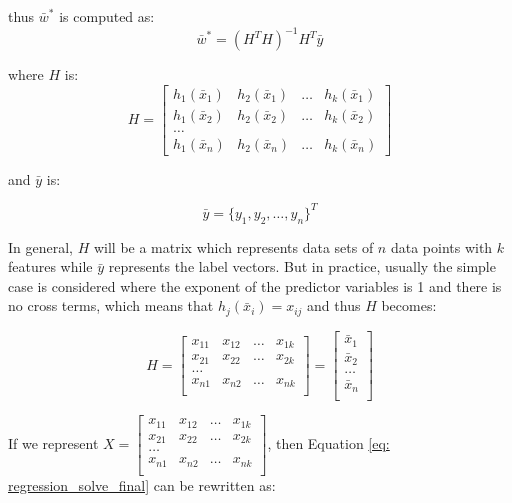 thus $\bar{w}^*$ is computed as:
\begin{equation}\label{eq: regression_solve_final}
    \bar{w}^*=(H^TH)^{-1}H^T\bar{y}
\end{equation}



where $H$ is:
\begin{equation}
    H=\begin{bmatrix}
h_1(\bar{x}_1) & h_2(\bar{x}_1) &\dots &h_k(\bar{x}_1)\\
h_1(\bar{x}_2) & h_2(\bar{x}_2) &\dots &h_k(\bar{x}_2)\\
\dots\\
h_1(\bar{x}_n) & h_2(\bar{x}_n) &\dots &h_k(\bar{x}_n)
\end{bmatrix}
\end{equation}

and $\bar{y}$ is:

\begin{equation}
    \bar{y} = \{y_1, y_2,\dots, y_n\}^T
\end{equation}

In general, $H$ will be a matrix which represents data sets of $n$ data points with $k$ features while $\bar{y}$ represents the label vectors. But in practice, usually the simple case is considered where the exponent of the predictor variables is 1 and there is no cross terms, which means that $h_j(\bar{x}_i) = x_{ij}$ and thus $H$ becomes:

\begin{equation}
    H=\begin{bmatrix}
x_{11} & x_{12} &\dots &x_{1k}\\
x_{21} & x_{22} &\dots &x_{2k}\\
\dots\\
x_{n1} & x_{n2} &\dots &x_{nk}\\
\end{bmatrix}
=\begin{bmatrix}
\bar{x}_1\\
\bar{x}_2\\
\dots\\
\bar{x}_n\\
\end{bmatrix}
\end{equation}

If we represent $X = \begin{bmatrix}
x_{11} & x_{12} &\dots &x_{1k}\\
x_{21} & x_{22} &\dots &x_{2k}\\
\dots\\
x_{n1} & x_{n2} &\dots &x_{nk}\\
\end{bmatrix}$, then Equation \ref{eq: regression_solve_final} can be rewritten as:

